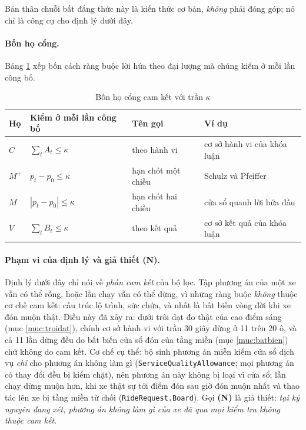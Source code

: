 Bản thân chuỗi bất đẳng thức này là kiến thức cơ bản, \emph{không} phải đóng góp; nó chỉ là công
cụ cho định lý dưới đây.

\paragraph{Bốn họ cổng.} Bảng \ref{bang:hocong} xếp bốn cách ràng buộc lời hứa theo đại lượng mà
chúng kiểm ở mỗi lần công bố.

\begin{table}[htbp]
\centering
\caption{Bốn họ cổng cam kết với trần $\kappa$}
\label{bang:hocong}
\small
\begin{tabular}{@{}llll@{}}
\toprule
\textbf{Họ} & \textbf{Kiểm ở mỗi lần công bố} & \textbf{Tên gọi} & \textbf{Ví dụ}\\
\midrule
$C$ & $\sum_t A_t \le \kappa$ & theo hành vi & cơ sở hành vi của khóa luận\\
$M^{+}$ & $p_t - p_0 \le \kappa$ & hạn chót một chiều & Schulz và Pfeiffer \cite{schulz2026}\\
$M$ & $|p_t - p_0| \le \kappa$ & hạn chót hai chiều & cửa sổ quanh lời hứa đầu\\
$V$ & $\sum_t B_t \le \kappa$ & theo kết quả & cơ sở kết quả của khóa luận\\
\bottomrule
\end{tabular}
\end{table}

\paragraph{Phạm vi của định lý và giả thiết (N).} Định lý dưới đây chỉ nói về \emph{phần cam kết}
của bộ lọc. Tập phương án của một xe vẫn có thể rỗng, hoặc lần chạy vẫn có thể dừng, vì những ràng
buộc \emph{không} thuộc cơ chế cam kết: cấu trúc lộ trình, sức chứa, và nhất là bất biến vòng đời
khi xe đón muộn thật. Điều này đã xảy ra: dưới trôi dạt đo thật của cao điểm sáng (mục
\ref{muc:troidat}), chính cơ sở hành vi với trần 30 giây dừng ở 11 trên 20 ô, và cả 11 lần dừng
đều do bất biến cửa sổ đón của tầng miền (mục \ref{muc:batbien}) chứ không do cam kết. Cơ chế cụ
thể: bộ sinh phương án miễn kiểm cửa sổ dịch vụ \emph{chỉ} cho phương án không làm gì
(\texttt{ServiceQualityAllowance}; mọi phương án có thay đổi đều bị kiểm chặt), nên phương án này
không bị loại vì cửa sổ; lần chạy dừng muộn hơn, khi xe thật sự tới điểm đón sau giờ đón muộn nhất
và thao tác lên xe bị tầng miền từ chối (\texttt{RideRequest.Board}). Gọi \textbf{(N)} là giả
thiết: \emph{tại kỷ nguyên đang xét, phương án không làm gì của xe đã qua mọi kiểm tra không thuộc
cam kết.}


